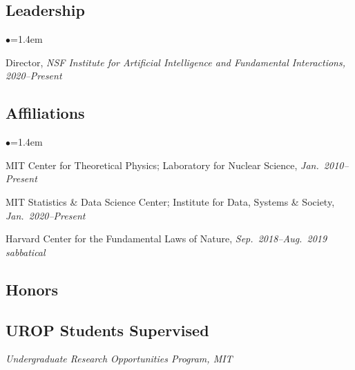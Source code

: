 \documentclass[11pt]{article}
\newcommand{\heading}[1]{\vspace{0in}\subsection*{#1} \vspace{.02in}}
\newcommand{\bbl}{\begin{list}{$\bullet$}{\leftmargin=1.4em \itemsep=-1pt}}
\newcommand{\el}{\end{list}}
\begin{document}

\newpage

\heading{Leadership}

\bbl
\item Director, \textit{NSF Institute for Artificial Intelligence and Fundamental Interactions, 2020--Present}
\el


\heading{Affiliations}

\bbl
\item MIT Center for Theoretical Physics; Laboratory for Nuclear Science, \textit{Jan.~2010--Present}
\item MIT Statistics \& Data Science Center; Institute for Data, Systems \& Society, \textit{Jan.~2020--Present}
\item Harvard Center for the Fundamental Laws of Nature, \textit{Sep.~2018--Aug.~2019 sabbatical}
\el



\heading{Honors}






\heading{UROP Students Supervised}
\vspace{-.1in}
\textit{Undergraduate Research Opportunities Program, MIT}
\end{document}
